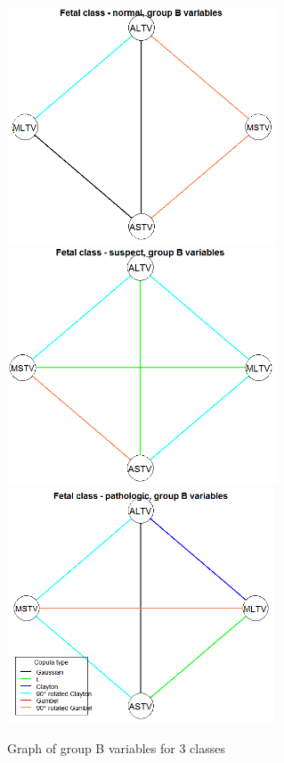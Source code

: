 \documentclass[11pt]{llncs}
\begin{document}
\begin{figure}[H]
	\centering
		\includegraphics[height=7cm]{ctgplot_1b.png}\\
		\includegraphics[height=7cm]{ctgplot_2b.png}\\
		\includegraphics[height=7cm]{ctgplot_3b.png}
	\label{fig:fig2}
	\caption{Graph of group B  variables for 3 classes}
\end{figure}
\end{document}
